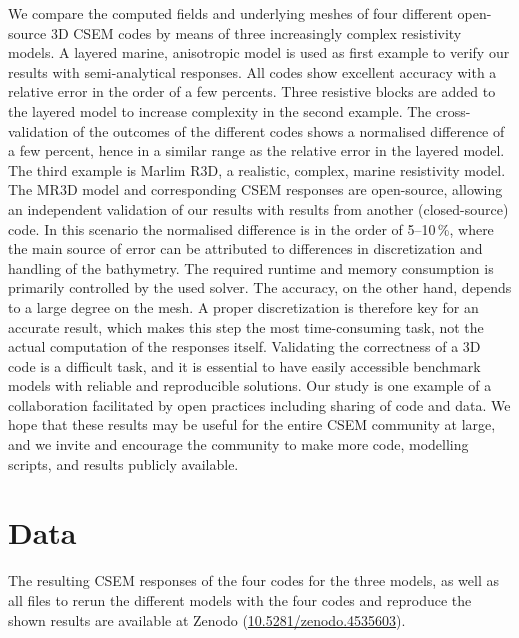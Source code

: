 \documentclass[extra, camera,%
]{gji}
\begin{document}
We compare the computed fields and underlying meshes of four different open-source 3D CSEM codes by means of three increasingly complex resistivity models. A layered marine, anisotropic model is used as first example to verify our results with semi-analytical responses. All codes show excellent accuracy with a relative error in the order of a few percents. Three resistive blocks are added to the layered model to increase complexity in the second example. The cross-validation of the outcomes of the different codes shows a normalised difference of a few percent, hence in a similar range as the relative error in the layered model. The third example is Marlim R3D, a realistic, complex, marine resistivity model. The MR3D model and corresponding CSEM responses are open-source, allowing an independent validation of our results with results from another (closed-source) code. In this scenario the normalised difference is in the order of 5--10\,\%, where the main source of error can be attributed to differences in discretization and handling of the bathymetry. The required runtime and memory consumption is primarily controlled by the used solver. The accuracy, on the other hand, depends to a large degree on the mesh. A proper discretization is therefore key for an accurate result, which makes this step the most time-consuming task, not the actual computation of the responses itself. Validating the correctness of a 3D code is a difficult task, and it is essential to have easily accessible benchmark models with reliable and reproducible solutions. Our study is one example of a collaboration facilitated by open practices including sharing of code and data. We hope that these results may be useful for the entire CSEM community at large, and we invite and encourage the community to make more code, modelling scripts, and results publicly available.


\section{Data}
The resulting CSEM responses of the four codes for the three models, as well as all files to rerun the different models with the four codes and reproduce the shown results are available at Zenodo (\href{https://doi.org/10.5281/zenodo.4535603}{10.5281/zenodo.4535603}).
\end{document}
